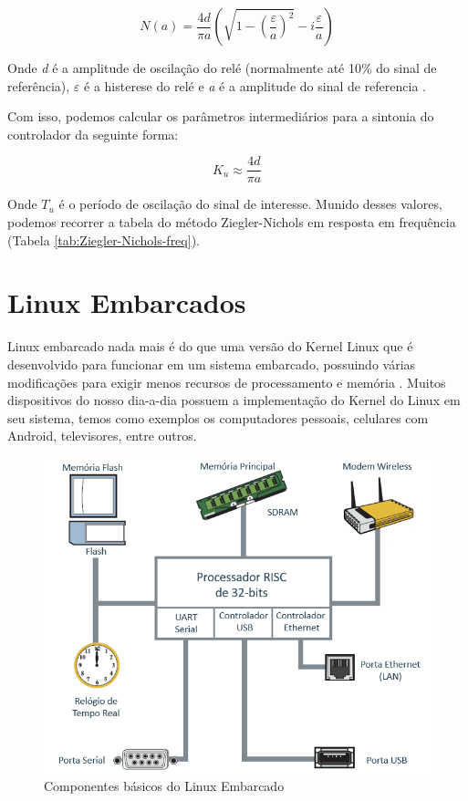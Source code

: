 \begin{equation}\label{eq:n(a)}
  N(a)=\frac{4d}{\pi a}\left(\sqrt{1-\left(\frac{\varepsilon}{a}\right)^{2}}-i\frac{\varepsilon}{a}\right) 
\end{equation}

Onde \textit{d} é a amplitude de oscilação do relé (normalmente até 10\% do sinal de referência), \textit{$\varepsilon$} é a histerese do relé e \textit{a} é a amplitude do sinal de referencia \cite{Levine1996}.

Com isso, podemos calcular os parâmetros intermediários para a sintonia do controlador da seguinte forma:

\begin{equation}
  K_u \approx \frac{4d}{\pi a}
\end{equation}

Onde $T_u$ é o período de oscilação do sinal de interesse. Munido desses valores, podemos recorrer a tabela do método Ziegler-Nichols em resposta em frequência (Tabela \ref{tab:Ziegler-Nichols-freq}).



\section{Linux Embarcados}

Linux embarcado  nada mais é do que uma versão do Kernel Linux que é desenvolvido para funcionar em um sistema embarcado, possuindo várias modificações para exigir menos recursos de processamento e memória \cite{Molloy2016}. Muitos dispositivos do nosso dia-a-dia possuem a implementação do Kernel do Linux em seu sistema, temos como exemplos os computadores pessoais, celulares com Android, televisores, entre outros. 

\begin{figure}[H]
  \caption{Componentes básicos do Linux Embarcado}
  \begin{center}
      \includegraphics[scale=0.65]{img/componentes_linux_p13}
  \end{center}
  \label{fig:componentes_linux_p13}
\end{figure}

